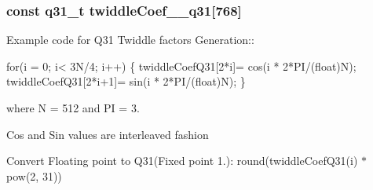 \subsubsection[{\texorpdfstring{twiddle\+Coef\+\_\+512\+\_\+q31}{twiddleCoef_512_q31}}]{\setlength{\rightskip}{0pt plus 5cm}const q31\+\_\+t twiddle\+Coef\+\_\+\_\+q31\mbox{[}768\mbox{]}}\hypertarget{group__CFFT__CIFFT_ga416c61b2f08542a39111e06b0378bebe}{}\label{group__CFFT__CIFFT_ga416c61b2f08542a39111e06b0378bebe}
\begin{DoxyParagraph}{}
Example code for Q31 Twiddle factors Generation\+:\+: 
\end{DoxyParagraph}
\begin{DoxyParagraph}{}

\begin{DoxyPre}for(i = 0; i< 3N/4; i++)
\{
   twiddleCoefQ31[2*i]= cos(i * 2*PI/(float)N);
   twiddleCoefQ31[2*i+1]= sin(i * 2*PI/(float)N);
\} \end{DoxyPre}
 
\end{DoxyParagraph}
\begin{DoxyParagraph}{}
where N = 512 and PI = 3. 
\end{DoxyParagraph}
\begin{DoxyParagraph}{}
Cos and Sin values are interleaved fashion 
\end{DoxyParagraph}
\begin{DoxyParagraph}{}
Convert Floating point to Q31(Fixed point 1.)\+: round(twiddle\+Coef\+Q31(i) $\ast$ pow(2, 31)) 
\end{DoxyParagraph}

